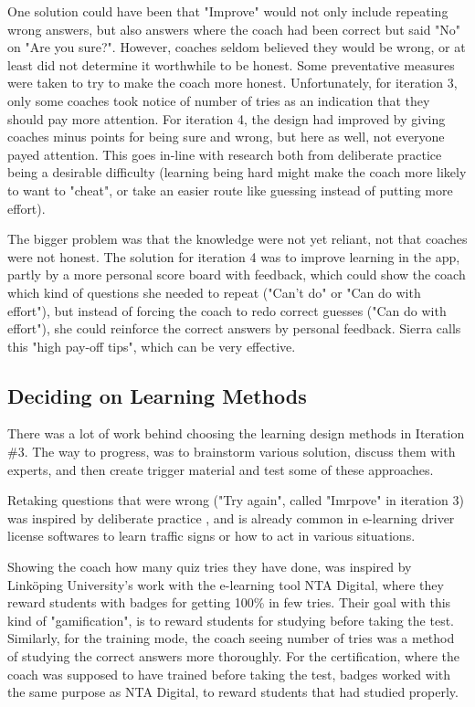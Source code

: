   One solution could have been that "Improve" would not only include repeating wrong answers, but also answers where the coach had been correct but said "No" on "Are you sure?". However, coaches seldom believed they would be wrong, or at least did not determine it worthwhile to be honest. Some preventative measures were taken to try to make the coach more honest. Unfortunately, for iteration 3, only some coaches took notice of number of tries as an indication that they should pay more attention. For iteration 4, the design had improved by giving coaches minus points for being sure and wrong, but here as well, not everyone payed attention. This goes in-line with research both from deliberate practice being a desirable difficulty (learning being hard might make the coach more likely to want to "cheat", or take an easier route like guessing instead of putting more effort).

  The bigger problem was that the knowledge were not yet reliant, not that coaches were not honest. The solution for iteration 4 was to improve learning in the app, partly by a more personal score board with feedback, which could show the coach which kind of questions she needed to repeat ("Can't do" or "Can do with effort"), but instead of forcing the coach to redo correct guesses ("Can do with effort"), she could reinforce the correct answers by personal feedback. Sierra \cite{sierra} calls this "high pay-off tips", which can be very effective.

  \subsection{Deciding on Learning Methods}
  There was a lot of work behind choosing the learning design methods in Iteration \#3. The way to progress, was to brainstorm various solution, discuss them with experts, and then create trigger material and test some of these approaches.

  Retaking questions that were wrong ("Try again", called "Imrpove" in iteration 3) was inspired by deliberate practice \cite{sierra}, and is already common in e-learning driver license softwares to learn traffic signs or how to act in various situations.

  Showing the coach how many quiz tries they have done, was inspired by Linköping University's work with the e-learning tool NTA Digital, where they reward students with badges for getting 100\% in few tries. Their goal with this kind of "gamification", is to reward students for studying before taking the test. Similarly, for the training mode, the coach seeing number of tries was a method of studying the correct answers more thoroughly. For the certification, where the coach was supposed to have trained before taking the test, badges worked with the same purpose as NTA Digital, to reward students that had studied properly.

